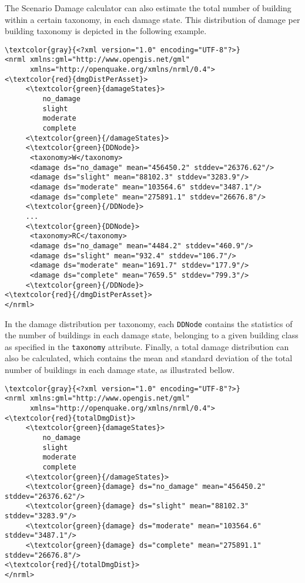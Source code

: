 The Scenario Damage calculator can also estimate the total number of building within a certain taxonomy, in each damage state. This  distribution of damage per building taxonomy is depicted in the following example.

\begin{Verbatim}[frame=single, commandchars=\\\{\}, samepage=false]
\textcolor{gray}{<?xml version="1.0" encoding="UTF-8"?>}
<nrml xmlns:gml="http://www.opengis.net/gml"
      xmlns="http://openquake.org/xmlns/nrml/0.4">
<\textcolor{red}{dmgDistPerAsset}>
     <\textcolor{green}{damageStates}> 
         no_damage 
         slight 
         moderate 
         complete
     <\textcolor{green}{/damageStates}>
     <\textcolor{green}{DDNode}>
      <taxonomy>W</taxonomy>
      <damage ds="no_damage" mean="456450.2" stddev="26376.62"/>
      <damage ds="slight" mean="88102.3" stddev="3283.9"/>
      <damage ds="moderate" mean="103564.6" stddev="3487.1"/>
      <damage ds="complete" mean="275891.1" stddev="26676.8"/>
     <\textcolor{green}{/DDNode}>
     ...
     <\textcolor{green}{DDNode}>
      <taxonomy>RC</taxonomy>
      <damage ds="no_damage" mean="4484.2" stddev="460.9"/>
      <damage ds="slight" mean="932.4" stddev="106.7"/>
      <damage ds="moderate" mean="1691.7" stddev="177.9"/>
      <damage ds="complete" mean="7659.5" stddev="799.3"/>
     <\textcolor{green}{/DDNode}>
<\textcolor{red}{/dmgDistPerAsset}>
</nrml>
\end{Verbatim}

In the damage distribution per taxonomy, each \Verb+DDNode+ contains the statistics of the number of buildings in each damage state, belonging to a given building class as specified in the \Verb+taxonomy+ attribute. 
Finally, a total damage distribution can also be calculated, which contains the mean and standard deviation of the total number of buildings in each damage state, as illustrated bellow.

\begin{Verbatim}[frame=single, commandchars=\\\{\}, samepage=false]
\textcolor{gray}{<?xml version="1.0" encoding="UTF-8"?>}
<nrml xmlns:gml="http://www.opengis.net/gml"
      xmlns="http://openquake.org/xmlns/nrml/0.4">
<\textcolor{red}{totalDmgDist}>
     <\textcolor{green}{damageStates}> 
         no_damage 
         slight 
         moderate 
         complete
     <\textcolor{green}{/damageStates}>
     <\textcolor{green}{damage} ds="no_damage" mean="456450.2" stddev="26376.62"/>
     <\textcolor{green}{damage} ds="slight" mean="88102.3" stddev="3283.9"/>
     <\textcolor{green}{damage} ds="moderate" mean="103564.6" stddev="3487.1"/>
     <\textcolor{green}{damage} ds="complete" mean="275891.1" stddev="26676.8"/>
<\textcolor{red}{/totalDmgDist}>
</nrml>
\end{Verbatim}

